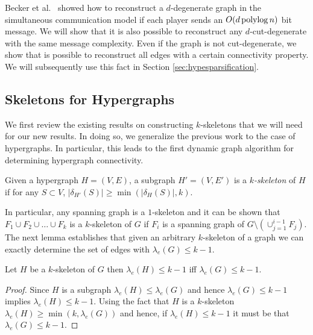 Becker et al.~\cite{BeckerMNRST11} showed how to reconstruct a $d$-degenerate graph in the simultaneous communication model if each player sends an $O(d\operatorname{polylog} n)$ bit message. We will show that it is also possible to reconstruct any $d$-cut-degenerate with the same message complexity. Even if the graph is not cut-degenerate, we show that is possible to reconstruct all edges with a certain connectivity property. We will subsequently use this fact in Section \ref{sec:hypesparsification}.


\subsection{Skeletons for Hypergraphs}
\label{sec:kskeletons}
We first review the existing results on constructing $k$-skeletons \cite{AhnGM12a} that we will need for our new results. In doing so, we generalize the previous work to the case of hypergraphs.  In particular, this leads to the first dynamic graph algorithm for determining hypergraph connectivity.

\begin{definition}[$k$-skeleton]
Given a hypergraph $H=(V,E)$, a subgraph $H'=(V,E')$ is a \emph{$k$-skeleton} of $H$ if for any $S\subset V$, $|\delta_{H'}(S)| \geq \min (|\delta_{H}(S)|,k)$.
\end{definition}

In particular, any spanning graph is a $1$-skeleton and it can be shown that $F_1\cup F_2 \cup \ldots \cup F_k$ is  a $k$-skeleton \cite{AhnGM12a} of $G$ if $F_i$ is a spanning graph of $G\setminus   (\cup_{j=1}^{i-1} F_{j} )$. The next lemma establishes that given an arbitrary $k$-skeleton of a graph we can exactly determine the set of edges with $\lambda_e(G)\leq k-1$.

\begin{lemma}\label{lem:skeletonlambda}
Let $H$ be a $k$-skeleton of $G$ then $\lambda_e(H)\leq k-1$ iff $\lambda_e(G)\leq k-1$.
\end{lemma} 
\begin{proof}
Since $H$ is a subgraph $\lambda_e(H)\leq \lambda_e(G)$ and hence $\lambda_e(G)\leq k-1$ implies $\lambda_e(H)\leq k-1$. Using the fact that $H$ is a $k$-skeleton $\lambda_e(H)\geq \min(k,\lambda_e(G))$ and hence, if $  \lambda_e(H)\leq k-1$ it must be that $\lambda_e(G)\leq k-1$.
\end{proof}

%

